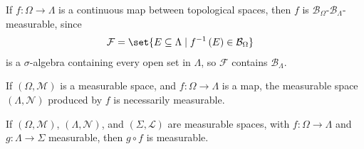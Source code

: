 \begin{example}
  If $f\colon \Omega\rightarrow \Lambda$ is a continuous map between topological spaces, then $f$ is $\mathcal{B}_{\Omega}$-$\mathcal{B}_{\Lambda}$-measurable, since
  \begin{align*}
    \mathcal{F} &= \set{E\subseteq \Lambda\mid f^{-1}\left(E\right)\in \mathcal{B}_{\Omega}}
  \end{align*}
  is a $\sigma$-algebra containing every open set in $\Lambda$, so $\mathcal{F}$ contains $\mathcal{B}_{\Lambda}$.
\end{example}

\begin{example}
  If $\left(\Omega,\mathcal{M}\right)$ is a measurable space, and $f\colon \Omega\rightarrow \Lambda$ is a map, the measurable space $\left(\Lambda,\mathcal{N}\right)$ produced by $f$ is necessarily measurable.
\end{example}

\begin{fact}
  If $\left(\Omega,\mathcal{M}\right)$, $\left(\Lambda,\mathcal{N}\right)$, and $\left(\Sigma,\mathcal{L}\right)$ are measurable spaces, with $f\colon \Omega\rightarrow \Lambda$ and $g\colon \Lambda\rightarrow \Sigma$ measurable, then $g\circ f$ is measurable.\label{fact:composition}
\end{fact}

